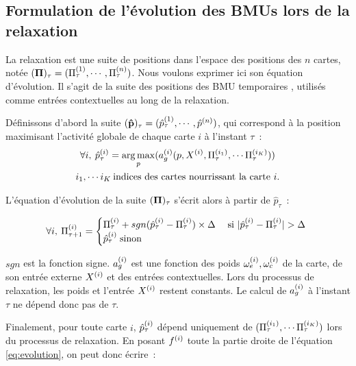 \documentclass[../main]{subfiles}
\begin{document}
\subsection{Formulation de l'évolution des BMUs lors de la relaxation}\label{sec:formulation_suite}

La relaxation est une suite de positions dans l'espace des positions des $n$ cartes, notée $(\mathbf{\Pi})_\tau = (\Pi^{({1})}_\tau,\cdots,\Pi^{({n})}_\tau)$. Nous voulons exprimer ici son équation d'évolution. Il s'agit de la suite des positions des \og BMU temporaires \fg{}, utilisés comme entrées contextuelles au long de la relaxation.

Définissons d'abord la suite $(\mathbf{\hat{p}})_\tau = (\hat{p}^{({1})}_\tau, \cdots, \hat{p}^{({n})})$, qui correspond à la position maximisant l'activité globale de chaque carte $i$ à l'instant $\tau$~:
\begin{equation}
\begin{gathered}
\forall i, \: \hat{p}^{({i})}_{\tau} = \operatorname*{arg\,max}\limits_p(a_g^{({i})}(p, X^{({i})}, \Pi^{({i_1})}_\tau, \cdots \Pi^{({i_K})}_\tau))\\
 i_1, \cdots i_K \: \text{indices des cartes nourrissant la carte $i$}.
\end{gathered}
\label{eq:pstar}
\end{equation}

L'équation d'évolution de la suite $(\mathbf{\Pi})_\tau$ s'écrit alors à partir de $\hat{p}_\tau$~:

\begin{equation}
\forall i, \: \Pi^{({i})}_{\tau+1} = 
\begin{cases}
\Pi^{({i})}_{\tau} + sgn(\hat{p}^{({i})}_{\tau} - \Pi^{({i})}_{\tau}) \times \Delta \; & \text{si $\lvert \hat{p}^{({i})}_{\tau} - \Pi^{({i})}_{\tau}\rvert > \Delta$ } \\
\hat{p}^{({i})}_{\tau} \; \text{sinon}	
\end{cases}
\label{eq:evolution}
\end{equation}

$sgn$ est la fonction signe.
$a_g^{({i})}$ est une fonction des poids $\omega_{e}^{({i})}, \omega_{c}^{({i})}$ de la carte, de son entrée externe $X^{({i})}$ et des entrées contextuelles.
Lors du processus de relaxation, les poids et l'entrée $X^{({i})}$ restent constants. 
Le calcul de $a_g^{({i})}$ à l'instant $\tau$ ne dépend donc pas de $\tau$.

Finalement, pour toute carte $i$, $\hat{p}^{({i})}_{\tau}$ dépend uniquement de $(\Pi^{({i_1})}_\tau, \cdots \Pi^{({i_K})}_\tau)$ lors du processus de relaxation.
En posant $f^{({i})}$ toute la partie droite de l'équation \ref{eq:evolution}, on peut donc écrire~:
\end{document}
